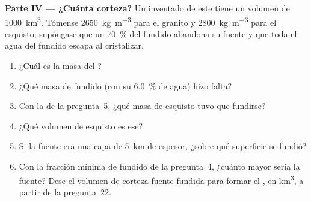 \begin{problem}
\noindent\textbf{Parte IV --- ¿Cuánta corteza?}
Un  inventado de este  tiene un volumen de \qty{1000}{\cubic\kilo\metre}.
Tómense \qty{2650}{\kilogram\per\cubic\metre} para el granito y
\qty{2800}{\kilogram\per\cubic\metre} para el esquisto; supóngase que un \qty{70}{\percent} del
fundido abandona su fuente y que toda el agua del fundido escapa al cristalizar.
\begin{enumerate}[resume]
\item ¿Cuál es la masa del ?
\item ¿Qué masa de fundido (con su \qty{6.0}{\percent} de agua) hizo falta?
\item Con la  de la pregunta~5, ¿qué masa de esquisto tuvo que fundirse?
\item ¿Qué volumen de esquisto es ese?
\item Si la fuente era una capa de \qty{5}{km} de espesor, ¿sobre qué superficie se fundió?
\item Con la fracción mínima de fundido de la pregunta~4, ¿cuánto mayor sería la
fuente? Dese el volumen de corteza fuente fundida para formar el , en
\unit{\cubic\kilo\metre}, a partir de la pregunta~22.
\end{enumerate}
\end{problem}
